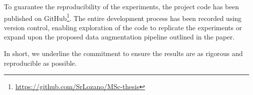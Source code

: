 To guarantee the reproducibility of the experiments, the project code has been published on GitHub\footnote{\href{https://github.com/SrLozano/MSc-thesis}{https://github.com/SrLozano/MSc-thesis}}. The entire development process has been recorded using version control, enabling exploration of the code to replicate the experiments or expand upon the proposed data augmentation pipeline outlined in the paper.

In short, we underline the commitment to ensure the results are as rigorous and reproducible as possible.
